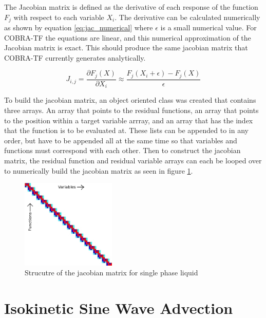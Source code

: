 \documentclass{mc2015}
\begin{document}
    The Jacobian matrix is defined as the derivative
    of each response of the function $F_{j}$ with respect to each variable $X_{i}$.
    The derivative can be calculated numerically as shown by equation
    \eqref{eq:jac_numerical} where $\epsilon$ is a small numerical value. For
    COBRA-TF the equations are linear, and this numerical approximation
    of the Jacobian matrix is exact. This should produce the same jacobian
    matrix that COBRA-TF currently generates analytically. 
    
    \begin{equation}
    	\label{eq:jac_numerical}
    	J_{i,j}=\frac{ \partial F_{j}(X)}{\partial X_{i}}
    	      \approx \frac{F_{j}(X_{i}+\epsilon)-F_{j}(X)}{\epsilon}
    \end{equation}
    
	To build the jacobian matrix, an object oriented class was created that
    contains three arrays. An array that points to the residual functions, an
    array that points to the position within a target variable arrray, and an
    array that has the index that the function is to be evaluated at. These
    lists can be appended to in any order, but have to be appended all at the
    same time so that variables and functions must correspond with each other.
    Then to construct the jacobian matrix, the residual function and residual
    variable arrays can each be looped over to numerically build the jacobian
    matrix as seen in figure \ref{fig:Jacobian_Setup}. 
    
    \begin{figure}[!h]
    	\centering
    	\includegraphics[width=0.40\textwidth]{images/Jacobian_Setup}
    	\caption{Strucutre of the jacobian matrix for single phase liquid}
    	\label{fig:Jacobian_Setup}
    \end{figure}



\section{Isokinetic Sine Wave Advection}
\end{document}
